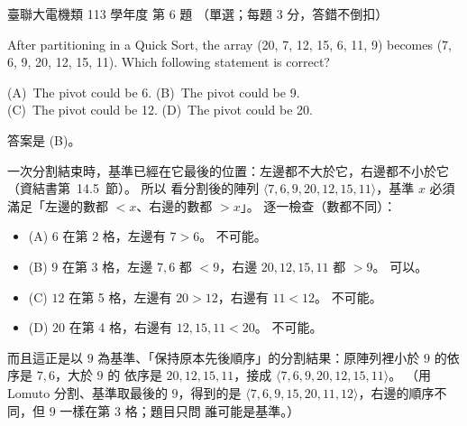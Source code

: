 \begin{pastexam}[label={px:ust-113-ee-ds-06}]{臺聯大電機類 113 學年度 第 6 題}
（單選；每題 3 分，答錯不倒扣）

After partitioning in a Quick Sort, the array (20, 7, 12, 15, 6, 11, 9) becomes (7, 6, 9, 20, 12, 15,
11). Which following statement is correct?

(A)~The pivot could be 6. \qquad (B)~The pivot could be 9.\\
(C)~The pivot could be 12. \qquad (D)~The pivot could be 20.
\end{pastexam}

\begin{pastsoln}
答案是 (B)。

一次分割結束時，基準已經在它最後的位置：左邊都不大於它，右邊都不小於它（資結書第~14.5~節）。 所以
看分割後的陣列 $\langle 7, 6, 9, 20, 12, 15, 11\rangle$，基準 $x$ 必須滿足「左邊的數都 $< x$、右邊的數都
$> x$」。 逐一檢查（數都不同）：
\begin{itemize}
\item (A) $6$ 在第 2 格，左邊有 $7 > 6$。 不可能。
\item (B) $9$ 在第 3 格，左邊 $7, 6$ 都 $< 9$，右邊 $20, 12, 15, 11$ 都 $> 9$。 可以。
\item (C) $12$ 在第 5 格，左邊有 $20 > 12$，右邊有 $11 < 12$。 不可能。
\item (D) $20$ 在第 4 格，右邊有 $12, 15, 11 < 20$。 不可能。
\end{itemize}
而且這正是以 $9$ 為基準、「保持原本先後順序」的分割結果：原陣列裡小於 $9$ 的依序是 $7, 6$，大於 $9$ 的
依序是 $20, 12, 15, 11$，接成 $\langle 7, 6, 9, 20, 12, 15, 11\rangle$。 （用 Lomuto 分割、基準取最後的
$9$，得到的是 $\langle 7, 6, 9, 15, 20, 11, 12\rangle$，右邊的順序不同，但 $9$ 一樣在第 3 格；題目只問
誰可能是基準。）
\end{pastsoln}
